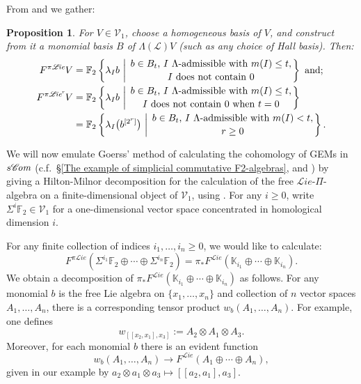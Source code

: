 \documentclass[11pt]{amsart} \renewcommand{\baselinestretch}{1.2}
\theoremstyle{plain}
\newtheorem{prop}[thm]{Proposition}
\numberwithin{equation}{section} %
\theoremstyle{plain}
\newtheorem{prop}[thm]{Proposition}
\numberwithin{equation}{chapter} %
\renewcommand{\to}{\longrightarrow}
\newcommand{\scrL}{\mathscr{L}}
\newcommand{\scrC}{\mathscr{C}}
\newcommand{\calV}{\mathcal{V}}
\newcommand{\citeBOX}[2][]{\cite[\mbox{#1}]{#2}}
\newcommand{\LieOperad}{{\scrL}}
\newcommand{\restnRepeated}[2]{#1^{[2^{#2}]}}
\newcommand{\vect}[2]{\calV^{#1}_{#2}}
\newcommand{\PA}[1]{\pi#1}
\newcommand{\minDimDelta}{m}
\newcommand{\F}{\mathbb{F}}
\newcommand{\algs}{{\scrC\!\textit{\normalfont\textit{om}}}}
\newcommand{\liealgs}{{\scrL\!\textit{ie}}}
\newcommand{\restliealgs}{{\scrL\!\textit{ie}^\textit{r}}}
\newcommand{\Ftwo}{\F_2}
\renewcommand{\mapsto}{\longmapsto}
\begin{document}
\begin{Constructing homotopy operations}
From  \cite[Theorem 8.8 and proof]{CurtisSimplicialHtpy.pdf} and \cite{6Author.pdf} we gather:
\begin{prop}
\label{Lie homotopy operations}
For $V\in\vect{}{1}$,   choose a homogeneous basis of $V$, and construct from it a monomial  basis $B$ of $\Lambda(\LieOperad)V$ (such as any choice of Hall basis). Then:
\begin{align*}
F^{\PA{\liealgs}}V&=\Ftwo \left\{\lambda_Ib\ \middle|\ \genfrac{}{}{0pt}{}{b\in B_t\textup{, $I$ $\Lambda$-admissible with }\minDimDelta(I)\leq t,}{\textup{$I$ does not contain 0}}\right\}\textup{ and;}
\\
F^{\PA{\restliealgs}}V&=\Ftwo \left\{\lambda_Ib\ \middle|\ \genfrac{}{}{0pt}{}{b\in B_t\textup{, $I$ $\Lambda$-admissible with }\minDimDelta(I)\leq t,}{\textup{$I$ does not contain 0 when $t=0$}}\right\}
\\
&=\Ftwo \left\{\lambda_I\bigl(\restnRepeated{b}{r}\bigr)\ \middle|\ \genfrac{}{}{0pt}{}{b\in B_t\textup{, $I$ $\Lambda$-admissible with }\minDimDelta(I)< t,}{\textup{$r\geq0$}}\right\}.
\end{align*}
\end{prop}
We will now emulate  Goerss' method of calculating the cohomology of GEMs in $s\algs$ (c.f.\ \S\ref{The example of simplicial commutative F2-algebras}, \cite{GoerssHiltonMilnor.pdf} and \citeBOX[\S11]{MR1089001}) by giving a Hilton-Milnor decomposition for the calculation of the free $\liealgs$-$\Pi$-algebra on a finite-dimensional object of $\vect{}{1}$, using \cite[Proposition 3.1]{Schles-SimpLieRing.pdf}. For any $i\geq0$, write $\Sigma^i\Ftwo \in\vect{}{1}$ for a one-dimensional vector space concentrated in homological dimension $i$.

For any finite collection of indices $i_1,\ldots,i_n\geq 0$, we would like to calculate:
\[F^{\PA{\liealgs}}(\Sigma^{i_1}\Ftwo\oplus\cdots \oplus\Sigma^{i_n}\Ftwo)=\pi_*F^\liealgs(\mathbb{K}_{i_1}\oplus\cdots \oplus \mathbb{K}_{i_n}).\]
We obtain a decomposition of $\pi_*F^\liealgs(\mathbb{K}_{i_1}\oplus\cdots \oplus \mathbb{K}_{i_n})$ as follows. For any monomial $b$ is the free Lie algebra on $\{x_1,\ldots,x_n\}$ and collection of $n$ vector spaces $A_{1},\ldots,A_n$, there is a corresponding tensor product $w_b(A_{1},\ldots,A_n)$. For example, one defines
\[w_{[[x_2,x_1],x_3]}:=A_2\otimes A_1\otimes A_3.\]
Moreover, for each monomial $b$ there is an evident function \[w_b(A_1,\ldots,A_n)\to F^\liealgs(A_1\oplus\cdots\oplus A_n),\]
given in our example by $a_2\otimes a_1\otimes a_3\mapsto [[a_2,a_1],a_3]$.


\end{Constructing homotopy operations}
\end{document}
